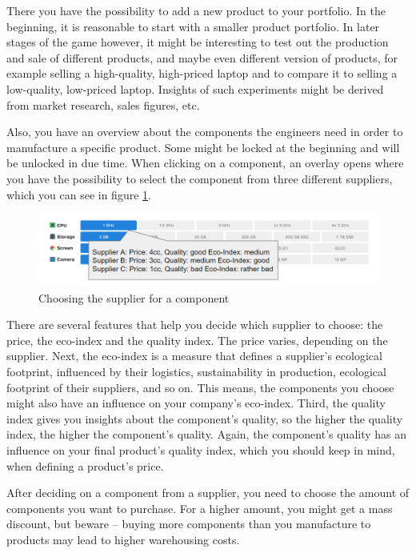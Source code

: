 There you have the possibility to add a new product to your portfolio. In the beginning, it is reasonable to start with a smaller product portfolio. In later stages of the game however, it might be interesting to test out the production and sale of different products, and maybe even different version of products, for example selling a high-quality, high-priced laptop and to compare it to selling a low-quality, low-priced laptop. Insights of such experiments might be derived from market research, sales figures, etc.

Also, you have an overview about the components the engineers need in order to manufacture a specific product. Some might be locked at the beginning and will be unlocked in due time. When clicking on a component, an overlay opens where you have the possibility to select the component from three different suppliers, which you can see in figure \ref{fig:procurementSupplier}. 
\begin{figure}[h]
    \centering
    \includegraphics[width=\textwidth]{images/procurementSupplier.png}
    \caption{Choosing the supplier for a component}
    \label{fig:procurementSupplier}
\end{figure}
There are several features that help you decide which supplier to choose: the price, the eco-index and the quality index. The price varies, depending on the supplier. Next, the eco-index is a measure that defines a supplier’s ecological footprint, influenced by their logistics, sustainability in production, ecological footprint of their suppliers, and so on. This means, the components you choose might also have an influence on your company’s eco-index. Third, the quality index gives you insights about the component’s quality, so the higher the quality index, the higher the component’s quality. Again, the component’s quality has an influence on your final product’s quality index, which you should keep in mind, when defining a product’s price.

After deciding on a component from a supplier, you need to choose the amount of components you want to purchase. For a higher amount, you might get a mass discount, but beware --  buying more components than you manufacture to products may lead to higher warehousing costs. 

